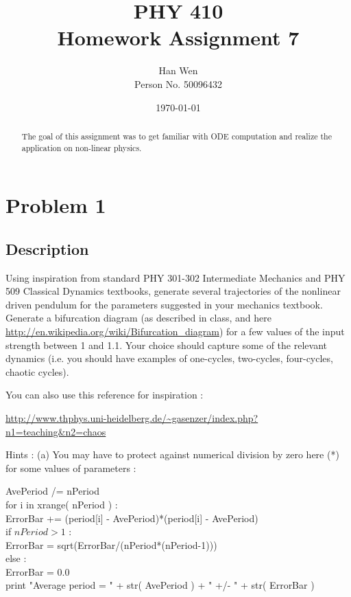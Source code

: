 \documentclass[11pt,letterpaper]{article}
\begin{document}
\title{PHY 410 \\ Homework Assignment 7}
\author{Han Wen \\ \tiny Person No. 50096432}
\date{\today}

\maketitle

\begin{abstract}
The goal of this assignment was to get familiar with ODE computation and realize the application on non-linear physics.  


\end{abstract}

\tableofcontents

\newpage
\section{Problem 1}

\subsection{Description}

Using inspiration from standard PHY 301-302 Intermediate Mechanics and PHY 509 Classical Dynamics textbooks, generate several trajectories of the nonlinear driven pendulum for the parameters suggested in your mechanics textbook. Generate a bifurcation diagram (as described in class, and here \url{http://en.wikipedia.org/wiki/Bifurcation_diagram}) for a few values of the input strength between 1 and 1.1. Your choice should capture some of the relevant dynamics (i.e. you should have examples of one-cycles, two-cycles, four-cycles, chaotic cycles).

You can also use this reference for inspiration : 

\url{http://www.thphys.uni-heidelberg.de/~gasenzer/index.php?n1=teaching&n2=chaos} 

Hints : (a) You may have to protect against numerical division by zero here (*) for some values of parameters : 

        AvePeriod /= nPeriod\\
   for i in xrange( nPeriod ) :\\
       ErrorBar += (period[i] - AvePeriod)*(period[i] - AvePeriod)\\
   if $nPeriod > 1$ :\\
       ErrorBar = sqrt(ErrorBar/(nPeriod*(nPeriod-1)))\\
   else :\\
       ErrorBar = 0.0\\
   print "Average period = " + str( AvePeriod ) + " +/- " + str( ErrorBar )\\
\end{document}
